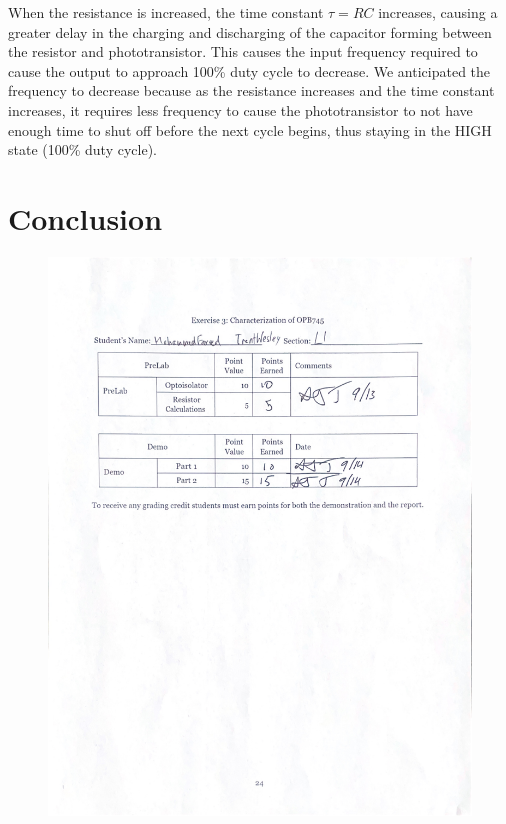 \documentclass[CMPE]{KGCOEReport}
\begin{document}
When the resistance is increased, the time constant $\tau=RC$ increases, causing a greater delay in the charging and discharging of the capacitor forming between the resistor and phototransistor. This causes the input frequency required to cause the output to approach 100\% duty cycle to decrease. We anticipated the frequency to decrease because as the resistance increases and the time constant increases, it requires less frequency to cause the phototransistor to not have enough time to shut off before the next cycle begins, thus staying in the HIGH state (100\% duty cycle).

\section*{Conclusion}

\newpage
\begin{figure}[H]
    \centering
    \begin{adjustbox}{center}
        \includegraphics[width=1.35\textwidth]{signoff.pdf}
    \end{adjustbox}
\end{figure}
\end{document}
